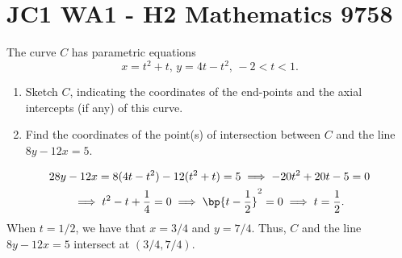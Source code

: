 \section{JC1 WA1 - H2 Mathematics 9758}

\begin{problem}
    The curve $C$ has parametric equations \[x = t^2 + t, \, y = 4t - t^2, \, -2 < t < 1.\]

    \begin{enumerate}
        \item Sketch $C$, indicating the coordinates of the end-points and the axial intercepts (if any) of this curve.
        \item Find the coordinates of the point(s) of intersection between $C$ and the line $8y - 12x = 5$.
    \end{enumerate}
\end{problem}
\begin{solution}
    \begin{ppart}
        \begin{center}
        \end{center}
    \end{ppart}
    \begin{ppart}
        \begin{gather*}{2}
            8y-12x = 8(4t-t^2) - 12(t^2 + t) = 5 \implies -20t^2 + 20t - 5 = 0 \\
            \implies t^2 - t + \frac14 = 0 \implies \bp{t - \frac12}^2 = 0 \implies t = \frac12.
        \end{gather*}
        When $t = 1/2$, we have that $x = 3/4$ and $y = 7/4$. Thus, $C$ and the line $8y-12x=5$ intersect at $(3/4, 7/4)$.
    \end{ppart}
\end{solution}

